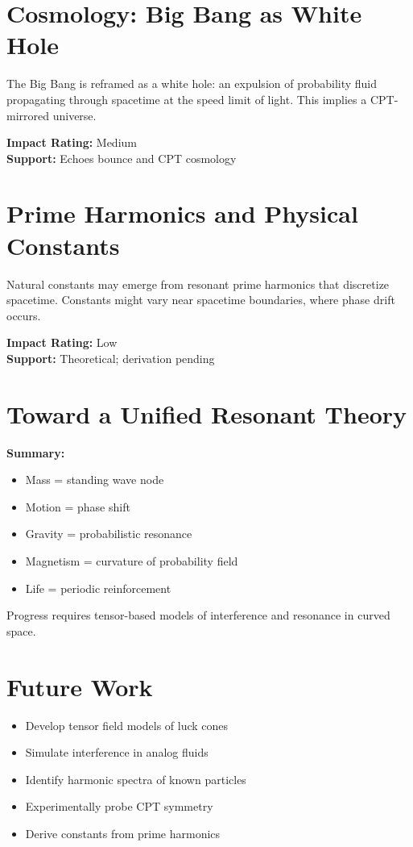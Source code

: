 \documentclass[12pt]{article}
\begin{document}
\section{Cosmology: Big Bang as White Hole}
The Big Bang is reframed as a white hole: an expulsion of probability fluid propagating through spacetime at the speed limit of light. This implies a CPT-mirrored universe.

\textbf{Impact Rating:} Medium\\
\textbf{Support:} Echoes bounce and CPT cosmology

\section{Prime Harmonics and Physical Constants}
Natural constants may emerge from resonant prime harmonics that discretize spacetime. Constants might vary near spacetime boundaries, where phase drift occurs.

\textbf{Impact Rating:} Low\\
\textbf{Support:} Theoretical; derivation pending

\section{Toward a Unified Resonant Theory}
\textbf{Summary:}
\begin{itemize}
 \item Mass = standing wave node
 \item Motion = phase shift
 \item Gravity = probabilistic resonance
 \item Magnetism = curvature of probability field
 \item Life = periodic reinforcement
\end{itemize}
Progress requires tensor-based models of interference and resonance in curved space.

\section{Future Work}
\begin{itemize}
 \item Develop tensor field models of luck cones
 \item Simulate interference in analog fluids
 \item Identify harmonic spectra of known particles
 \item Experimentally probe CPT symmetry
 \item Derive constants from prime harmonics
\end{itemize}
\end{document}
